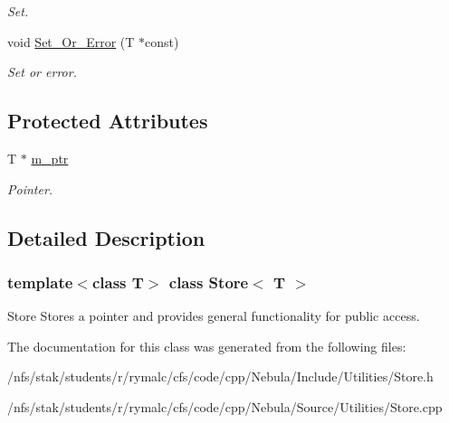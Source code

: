 \begin{DoxyCompactItemize}
\begin{DoxyCompactList}\small\item\em Set. \item\end{DoxyCompactList}\item 
\hypertarget{classStore_a8cc1f2a398201314b214f3e48465e7c6}{
void \hyperlink{classStore_a8cc1f2a398201314b214f3e48465e7c6}{Set\_\-Or\_\-Error} (T $\ast$const)}
\label{classStore_a8cc1f2a398201314b214f3e48465e7c6}

\begin{DoxyCompactList}\small\item\em Set or error. \item\end{DoxyCompactList}\end{DoxyCompactItemize}
\subsection*{Protected Attributes}
\begin{DoxyCompactItemize}
\item 
\hypertarget{classStore_ab717ff4dc7ae42c50feb014b921023ce}{
T $\ast$ \hyperlink{classStore_ab717ff4dc7ae42c50feb014b921023ce}{m\_\-ptr}}
\label{classStore_ab717ff4dc7ae42c50feb014b921023ce}

\begin{DoxyCompactList}\small\item\em Pointer. \item\end{DoxyCompactList}\end{DoxyCompactItemize}


\subsection{Detailed Description}
\subsubsection*{template$<$class T$>$ class Store$<$ T $>$}

Store Stores a pointer and provides general functionality for public access. 

The documentation for this class was generated from the following files:\begin{DoxyCompactItemize}
\item 
/nfs/stak/students/r/rymalc/cfs/code/cpp/Nebula/Include/Utilities/Store.h\item 
/nfs/stak/students/r/rymalc/cfs/code/cpp/Nebula/Source/Utilities/Store.cpp\end{DoxyCompactItemize}
